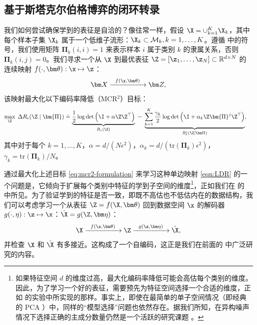 \documentclass[../../book-main_zh.tex]{subfiles}
\begin{document}
\subsection{基于斯塔克尔伯格博弈的闭环转录}\label{sec:closed-loop-transcription}

我们如何尝试确保学到的表征是自洽的？像往常一样，假设 $\X = \cup_{k=1}^K \X_k$，其中每个样本子集 $\X_k$ 属于一个低维子流形：$\X_k \subset \mathcal{M}_k, k = 1,\ldots, K$。遵循  中的符号，我们使用矩阵 $\bm \Pi_k(i,i) = 1$ 来表示样本 $i$ 属于类别 $k$ 的隶属关系，否则 $\bm \Pi_k(i,j) = 0$。我们寻求一个从 $\X$ 到最优表征 $\Z = [\z_1, \ldots, \z_N] \subset \mathbb{R}^{d \times N}$ 的连续映射 $f(\cdot,\bm \theta): \x \mapsto \z$：
\begin{equation}
    \bm X  \xrightarrow{\hspace{2mm} f(\x, \bm \theta) \hspace{2mm}} \bm Z,
    \label{eqn:LDR}
\end{equation}
该映射最大化以下编码率降低（MCR$^2$）目标：
\begin{equation}\label{eq:mcr2-formulation}
    \begin{split}
        \max_{\Z} \; \Delta R_\epsilon(\Z  \mid \bm{\Pi}) %
        &\doteq \underbrace{\frac{1}{2}\log\det \Big(\I + {\alpha} \Z
        \Z^\top \Big)}_{R_{\epsilon}(\Z)} \;-\;
        \underbrace{\sum_{k=1}^{K}\frac{\gamma_k}{2} \log\det\Big(\I
                + {\alpha_k} \Z \bm{\Pi}^{j} \Z^\top
        \Big)}_{R^c_{\epsilon}(\Z \mid \bm \Pi)},
    \end{split}
\end{equation}
其中对于每个 $k = 1,\dots, K$，$\alpha = {d}/({N\epsilon^2})$，$\alpha_k =
d/({\mathrm{tr}(\bm{\Pi}_k)\epsilon^2})$，$\gamma_k =
{\mathrm{tr}(\bm{\Pi}_{k})}/{N}$。

通过最大化上述目标 \eqref{eq:mcr2-formulation} 来学习这种单边映射 \eqref{eqn:LDR} 的一个问题是，它倾向于扩展每个类别中特征的学到子空间的维度\footnote{如果特征空间 $d$ 的维度过高，最大化编码率降低可能会高估每个类别的维度。因此，为了学习一个好的表征，需要预先为特征空间选择一个合适的维度，正如 \cite{yu2020learning} 的实验中所实现的那样。事实上，即使在最简单的单子空间情况（即经典的 PCA \cite{Jolliffe1986}）中，同样的“模型选择”问题也依然存在。据我们所知，在异构噪声情况下选择正确的主成分数量仍然是一个活跃的研究课题 \cite{hong2020selecting}。}，正如我们在  的  中所见。为了验证学到的特征是否一致，即既不高估也不低估内在的数据结构，我们可以考虑学习一个从表征 $\Z =
f(\X,\bm\theta)$ 回到数据空间 $\x$ 的解码器 $g(\cdot,\eta): \z \mapsto  \x$：$\hat \X = g(\Z, \bm\eta)$：
\begin{equation}
    \X \xrightarrow{\hspace{2mm} f(\x, \bm\theta)\hspace{2mm}} \Z
    \xrightarrow{\hspace{2mm} g(\z, \bm \eta) \hspace{2mm}} \hat \X,
    \label{eqn:autoencoding-ch6}
\end{equation}
并检查 $\X$ 和 $\hat \X$ 有多接近。这构成了一个自编码，这正是我们在前面的  中广泛研究的内容。
\end{document}

